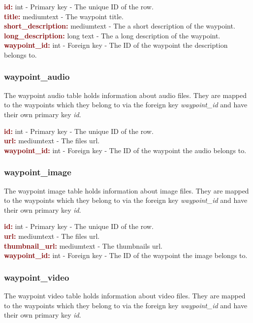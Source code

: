 \documentclass[11pt,a4paper]{report}
\begin{document}
\textbf{\textcolor{Maroon}{id:}} int - Primary key - The unique ID of the row. \\
\textbf{\textcolor{Maroon}{title:}} mediumtext -  The waypoint title.\\
\textbf{\textcolor{Maroon}{short\_description:}} mediumtext - The a short description of the waypoint.\\
\textbf{\textcolor{Maroon}{long\_description:}} long text - The a long description of the waypoint. \\
\textbf{\textcolor{Maroon}{waypoint\_id:}} int - Foreign key - The ID of the waypoint the description belongs to.

\subsubsection{waypoint\_audio}
The waypoint audio table holds information about audio files. They are mapped to the waypoints which they belong to via the foreign key \textit{waypoint\_id} and have their own primary key \textit{id}.

\textbf{\textcolor{Maroon}{id:}} int - Primary key - The unique ID of the row. \\
\textbf{\textcolor{Maroon}{url:}} mediumtext -  The files url.\\
\textbf{\textcolor{Maroon}{waypoint\_id:}} int - Foreign key - The ID of the waypoint the audio belongs to.

\subsubsection{waypoint\_image}
The waypoint image table holds information about image files. They are mapped to the waypoints which they belong to via the foreign key \textit{waypoint\_id} and have their own primary key \textit{id}.

\textbf{\textcolor{Maroon}{id:}} int - Primary key - The unique ID of the row. \\
\textbf{\textcolor{Maroon}{url:}} mediumtext -  The files url.\\
\textbf{\textcolor{Maroon}{thumbnail\_url:}} mediumtext - The thumbnails url.\\
\textbf{\textcolor{Maroon}{waypoint\_id:}} int - Foreign key - The ID of the waypoint the image belongs to.

\subsubsection{waypoint\_video}
The waypoint video table holds information about video files. They are mapped to the waypoints which they belong to via the foreign key \textit{waypoint\_id} and have their own primary key \textit{id}.
\end{document}

